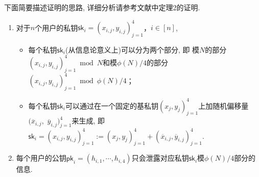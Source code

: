 下面简要描述证明的思路, 详细分析请参考文献\cite{HLL-ASIACRYPT-2016}中定理2的证明.
\begin{enumerate}
    \item  对于$n$个用户的私钥$\mathsf{sk}_i =(x_{i,j}, y_{i,j})_{j = 1}^4$，$i \in [n]$,
         \begin{itemize}
         \item  每个私钥$\mathsf{sk}_i$(从信息论意义上)可以分为两个部分, 即
        模$N$的部分$(x_{i,j}, y_{i,j})_{j = 1}^4 \bmod N$和模$\phi(N)/4$的部分$(x_{i,j}, y_{i,j})_{j = 1}^4 \bmod \phi(N)/4$；
         \item  每个私钥$\mathsf{sk}_i$可以通过在一个固定的基私钥$(x_{j}, y_{j})_{j = 1}^4$上加随机偏移量$(\overline{x}_{i,j},$ $\overline{y}_{i,j})_{j = 1}^4$来生成, 即$\mathsf{sk}_i = (x_{i,j}, y_{i,j})_{j=1}^4 := (x_{j}, y_{j})_{j=1}^4 + (\overline{x}_{i,j}, \overline{y}_{i,j})_{j=1}^4$.
         \end{itemize}
    \item   每个用户的公钥$\mathsf{pk}_i =  (h_{i,1}, \cdots, h_{i,4})$只会泄露对应私钥$\mathsf{sk}_i$模$\phi(N)/4$部分的信息.


\end{enumerate}
